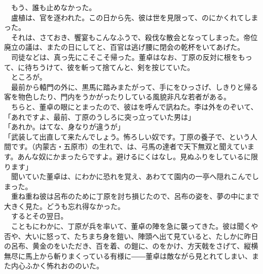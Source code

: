\documentclass[
  paper=a5,
  fontsize=10pt,
  jafontsize=9.5pt,
  tate,                  %
  open_bracket_pos=nibu, %
]{jlreq}
\begin{document}
　もう、誰も止めなかった。\\


　盧植は、官を逐われた。この日から先、彼は世を見限って、のにかくれてしまった。\\


　それは、さておき、饗宴もこんなふうで、殺伐な散会となってしまった。帝位廃立の議は、またの日にしてと、百官は逃げ腰に閉会の乾杯をいてあげた。\\


　司徒などは、真っ先にこそこそ帰った。董卓はなお、丁原の反対に根をもって、に待ちうけて、彼を斬って捨てんと、剣を按じていた。\\


　ところが。\\


　最前から轅門の外に、黒馬に踏みまたがって、手にをひっさげ、しきりと帰る客を物色したり、門内をうかがったりしている風貌非凡な若者がある。\\


　ちらと、董卓の眼にとまったので、彼はを呼んで訊ねた。李は外をのぞいて、\\


「あれですよ、最前、丁原のうしろに突っ立っていた男は」\\


「あれか。はてな、身なりが違うが」\\


「武装して出直して来たんでしょう。怖ろしい奴です。丁原の養子で、という人間です。（内蒙古・五原市）の生れで、は、弓馬の達者で天下無双と聞えています。あんな奴にかまったらですよ。避けるにくはなし。見ぬふりをしているに限ります」\\


　聞いていた董卓は、にわかに恐れを覚え、あわてて園内の一亭へ隠れこんでしまった。\\


　重ね重ね彼は呂布のために丁原を討ち損じたので、呂布の姿を、夢の中にまで大きく見た。どうも忘れ得なかった。\\


　するとその翌日。\\


　こともにわかに、丁原が兵を率いて、董卓の陣を急に襲ってきた。彼は聞くや否や、大いに怒って、たちまち身を鎧い、陣頭へ出て見ていると、たしかに昨日の呂布、黄金のをいただき、百を着、の鎧に、のをかけ、方天戟をさげて、縦横無尽に馬上から斬りまくっている有様に――董卓は敵ながら見とれてしまい、また内心ふかく怖れおののいた。\\
\end{document}
